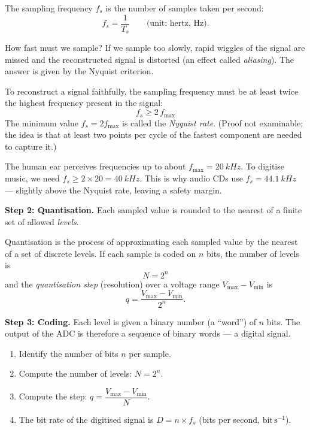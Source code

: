 \documentclass[11pt]{article}
\newcommand{\cle}[1]{{\popxbold\color{popdark}#1}}
\begin{document}
\begin{definition}
The \cle{sampling frequency} $f_s$ is the number of samples taken per second:
\[ f_s = \frac{1}{T_s} \qquad \text{(unit: hertz, Hz)}. \]
\end{definition}

How fast must we sample? If we sample too slowly, rapid wiggles of the signal are missed and the reconstructed signal is distorted (an effect called \emph{aliasing}). The answer is given by the Nyquist criterion.

\begin{propriete}
To reconstruct a signal faithfully, the sampling frequency must be at least twice the highest frequency present in the signal:
\[ \boxed{\,f_s \geq 2\,f_{\max}\,} \]
The minimum value $f_s = 2f_{\max}$ is called the \emph{Nyquist rate}. (Proof not examinable; the idea is that at least two points per cycle of the fastest component are needed to capture it.)
\end{propriete}

\begin{exemplebox}
The human ear perceives frequencies up to about $f_{\max} = \SI{20}{kHz}$. To digitise music, we need $f_s \geq 2 \times 20 = \SI{40}{kHz}$. This is why audio CDs use $f_s = \SI{44.1}{kHz}$ --- slightly above the Nyquist rate, leaving a safety margin.
\end{exemplebox}

\textbf{Step 2: Quantisation.} Each sampled value is rounded to the nearest of a finite set of allowed \emph{levels}.

\begin{definition}[Quantisation]
\cle{Quantisation} is the process of approximating each sampled value by the nearest of a set of discrete levels. If each sample is coded on $n$ \cle{bits}, the number of levels is
\[ \boxed{\,N = 2^{n}\,} \]
and the \emph{quantisation step} (resolution) over a voltage range $V_{\max}-V_{\min}$ is
\[ q = \frac{V_{\max}-V_{\min}}{2^{n}}. \]
\end{definition}

\textbf{Step 3: Coding.} Each level is given a binary number (a ``word'') of $n$ bits. The output of the ADC is therefore a sequence of binary words --- a digital signal.

\begin{methode}
\begin{enumerate}
\item Identify the number of bits $n$ per sample.
\item Compute the number of levels: $N = 2^{n}$.
\item Compute the step: $q = \dfrac{V_{\max}-V_{\min}}{N}$.
\item The bit rate of the digitised signal is $D = n \times f_s$ (bits per second, $\mathrm{bit\,s^{-1}}$).
\end{enumerate}
\end{methode}
\end{document}
